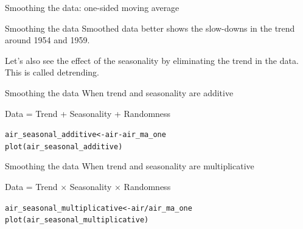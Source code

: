 \documentclass{beamer}\usepackage[]{graphicx}\usepackage[]{color}
\makeatletter
\newcommand{\hlopt}[1]{\textcolor[rgb]{1,0.894,0.769}{#1}}%
\newcommand{\hlstd}[1]{\textcolor[rgb]{1,0.894,0.769}{#1}}%
\newcommand{\hlkwb}[1]{\textcolor[rgb]{0.804,0.776,0.451}{#1}}%
\newcommand{\hlkwd}[1]{\textcolor[rgb]{1,0.78,0.769}{#1}}%
\newenvironment{kframe}{%
 \def\at@end@of@kframe{}%
 \ifinner\ifhmode%
  \def\at@end@of@kframe{\end{minipage}}%
  \begin{minipage}{\columnwidth}%
 \fi\fi%
 \def\FrameCommand##1{\hskip\@totalleftmargin \hskip-\fboxsep
 \colorbox{shadecolor}{##1}\hskip-\fboxsep
     \hskip-\linewidth \hskip-\@totalleftmargin \hskip\columnwidth}%
 \MakeFramed {\advance\hsize-\width
   \@totalleftmargin\z@ \linewidth\hsize
   \@setminipage}}%
 {\par\unskip\endMakeFramed%
 \at@end@of@kframe}
\newenvironment{knitrout}{}{} %
\makeatother
\begin{document}
\begin{darkframes}
\begin{frame}[fragile]{Smoothing the data: one-sided moving average}
\begin{knitrout}
\end{knitrout}
    
    \end{frame}
    
    
    
    
    \begin{frame}[fragile]{Smoothing the data}
      \fontsize{9}{9}\selectfont
      Smoothed data better shows the slow-downs in the trend around 1954 and 1959.
      \bigskip
      
      Let's also see the effect of the seasonality by eliminating the trend in the data. This is called \alert{detrending}.

    \end{frame}
    
    
    
    \begin{frame}[fragile]{Smoothing the data}
      \fontsize{9}{9}\selectfont
      When trend and seasonality are additive
      \begin{center}
        Data = Trend + Seasonality + Randomness
      \end{center}
     
\begin{knitrout}
\begin{kframe}
\begin{alltt}
      \hlstd{air_seasonal_additive} \hlkwb{<-} \hlstd{air} \hlopt{-} \hlstd{air_ma_one}
      \hlkwd{plot}\hlstd{(air_seasonal_additive)}
\end{alltt}
\end{kframe}


\end{knitrout}
  
    \end{frame}
    
    
      \begin{frame}[fragile]{Smoothing the data}
      \fontsize{9}{9}\selectfont
        When trend and seasonality are multiplicative
      \begin{center}
        Data = Trend $\times$ Seasonality $\times$ Randomness
      \end{center}
     
\begin{knitrout}
\begin{kframe}
\begin{alltt}
      \hlstd{air_seasonal_multiplicative} \hlkwb{<-} \hlstd{air}\hlopt{/} \hlstd{air_ma_one}
      \hlkwd{plot}\hlstd{(air_seasonal_multiplicative)}
\end{alltt}
\end{kframe}



\end{knitrout}
\end{frame}
\end{darkframes}
\end{document}
